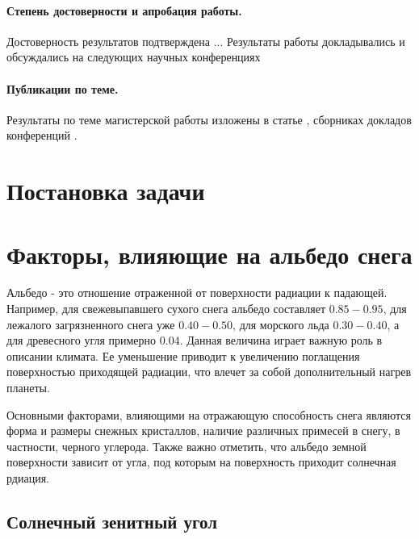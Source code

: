 \documentclass[a4paper, fontsize=14pt]{scrartcl}
\begin{document}
\paragraph{Степень достоверности и апробация работы.}
Достоверность результатов подтверждена ...
Результаты работы докладывались и обсуждались на следующих научных конференциях


\paragraph{Публикации по теме.}
Результаты по теме магистерской работы изложены в статье \cite{Chernenkov2021rus, Chernenkov2021}, сборниках докладов конференций \cite{MSARD2019, mipt2019, EGU2020poster, EGU2020, mipt2020, Arctic2020}.



\newpage
\section{Постановка задачи}


\newpage
\section{Факторы, влияющие на альбедо снега}
Альбедо - это отношение отраженной от поверхности радиации к падающей. Например, для свежевыпавшего сухого снега альбедо составляет $0.85-0.95$, для лежалого загрязненного снега уже $0.40-0.50$, для морского льда $0.30-0.40$, а для древесного угля примерно $0.04$. Данная величина играет важную роль в описании климата. Ее уменьшение приводит к увеличению поглащения поверхностью приходящей радиации, что влечет за собой дополнительный нагрев планеты. 

Основными факторами, влияющими на отражающую способность снега являются форма и размеры снежных кристаллов, наличие различных примесей в снегу, в частности, черного углерода. Также важно отметить, что альбедо земной поверхности зависит от угла, под которым на поверхность приходит солнечная рдиация.


\subsection{Солнечный зенитный угол}
\end{document}
